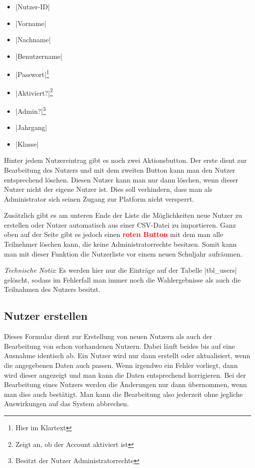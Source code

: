\documentclass[ngerman]{ltxdoc}
\begin{document}
\begin{multicols}{3}
  \begin{itemize}
    \item |Nutzer-ID|
    \item |Vorname|
    \item |Nachname|
    \item |Benutzername|
    \item |Passwort|\footnote{Hier im Klartext}
    \item |Aktiviert?|\footnote{Zeigt an, ob der Account aktiviert ist}
    \item |Admin?|\footnote{Besitzt der Nutzer Administratorrechte}
    \item |Jahrgang|
    \item |Klasse|
  \end{itemize}
\end{multicols}

Hinter jedem Nutzereintrag gibt es noch zwei Aktionsbutton. Der erste dient zur
Bearbeitung des Nutzers und mit dem zweiten Button kann man den Nutzer entsprechend
löschen. Diesen Nutzer kann man nur dann löschen, wenn dieser Nutzer nicht der
eigene Nutzer ist. Dies soll verhindern, dass man als Administrator sich seinen
Zugang zur Platform nicht versperrt.

Zusätzlich gibt es am unteren Ende der Liste die Möglichkeiten neue Nutzer zu erstellen oder Nutzer
automatisch aus einer CSV-Datei zu importieren. Ganz oben auf der Seite gibt es
jedoch einen \textcolor{red}{\textbf{roten Button}} mit dem man alle Teilnehmer
löschen kann, die keine Administratorrechte besitzen. Somit kann man mit dieser
Funktion die Nutzerliste vor einem neuen Schuljahr aufräumen.

\textit{Technische Notiz}: Es werden hier nur die Einträge auf der Tabelle |tbl_users|
gelöscht, sodass im Fehlerfall man immer noch die Wahlergebnisse als auch die
Teilnahmen des Nutzers besitzt.

\subsection{Nutzer erstellen}

Dieses Formular dient zur Erstellung von neuen Nutzern als auch der Bearbeitung
von schon vorhandenen Nutzern. Dabei läuft beides bis auf eine Ausnahme identisch
ab. Ein Nutzer wird nur dann erstellt oder aktualisiert, wenn die angegebenen Daten
auch passen. Wenn irgendwo ein Fehler vorliegt, dann wird dieser angezeigt und man
kann die Daten entsprechend korrigieren. Bei der Bearbeitung eines Nutzers werden
die Änderungen nur dann übernommen, wenn man dies auch bestätigt. Man kann die Bearbeitung
also jederzeit ohne jegliche Auswirkungen auf das System abbrechen.
\end{document}
